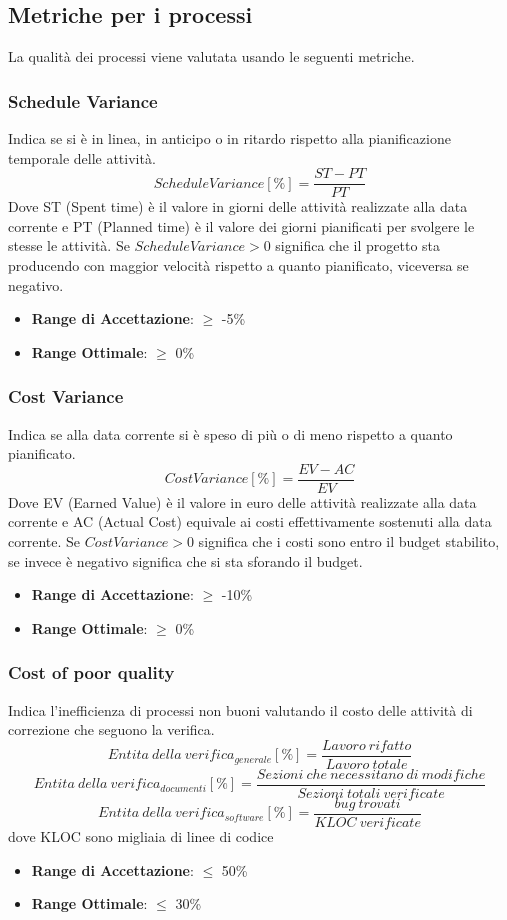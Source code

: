 \documentclass[12pt,a4paper]{article}
\begin{document}
\subsection{Metriche per i processi}\label{metriche_processi}
La qualità dei processi viene valutata usando le seguenti metriche.
\subsubsection{Schedule Variance}
Indica se si è in linea, in anticipo o in ritardo rispetto alla pianificazione temporale delle attività.
\[ScheduleVariance [\%] = \frac{ST - PT}{PT}\]
Dove ST (Spent time) è il valore in giorni delle attività realizzate alla data corrente e PT (Planned time) è il valore dei giorni pianificati per svolgere le stesse le attività.
Se $ScheduleVariance > 0$ significa che il progetto sta producendo con maggior velocità rispetto a quanto pianificato, viceversa se negativo.
\begin{itemize}
\item \textbf{Range di Accettazione}: $\geq$ -5\%
\item \textbf{Range Ottimale}: $\geq$ 0\%
\end{itemize}
\subsubsection{Cost Variance}
Indica se alla data corrente si è speso di più o di meno rispetto a quanto pianificato.
\[CostVariance [\%] = \frac{EV - AC}{EV}\]
Dove EV (Earned Value) è il valore in euro delle attività realizzate alla data corrente e AC (Actual Cost) equivale ai costi effettivamente sostenuti alla data corrente.
Se $CostVariance > 0$ significa che i costi sono entro il budget stabilito, se invece è negativo significa che si sta sforando il budget.
\begin{itemize}
\item \textbf{Range di Accettazione}: $\geq$ -10\%
\item \textbf{Range Ottimale}: $\geq$ 0\%
\end{itemize}
\subsubsection{Cost of poor quality}
Indica l'inefficienza di processi non buoni valutando il costo delle attività di correzione che seguono la verifica.
	\[Entita\ della\ verifica_{generale}[\%]= \frac{Lavoro\ rifatto}{Lavoro\ totale}\]
	\[Entita\ della\ verifica_{documenti}[\%]= \frac{Sezioni\ che\ necessitano\ di\ modifiche}{Sezioni\ totali\ verificate}\]
	\[Entita\ della\ verifica_{software}[\%]= \frac{bug\ trovati}{KLOC\ verificate}\]
dove KLOC sono migliaia di linee di codice
\begin{itemize}
	\item \textbf{Range di Accettazione}: $\leq$ 50\%
	\item \textbf{Range Ottimale}: $\leq$ 30\%
\end{itemize}
\end{document}
